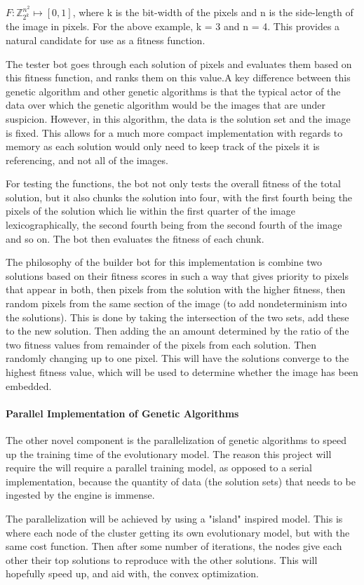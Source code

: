 \documentclass[12pt]{article}
\begin{document}
$ F : {\mathbb{Z}_{2^k}^{n^2}} \mapsto [0, 1] $, where k is the bit-width of the pixels and n is the side-length of the image in pixels. For the above example, k = 3 and n = 4. This provides a natural candidate for use as a fitness function.
\par The tester bot goes through each solution of pixels and evaluates them based on this fitness function, and ranks them on this value.A key difference between this genetic algorithm and other genetic algorithms is that the typical actor of the data over which the genetic algorithm would be the images that are under suspicion. However, in this algorithm, the data is the solution set and the image is fixed. This allows for a much more compact implementation with regards to memory as each solution would only need to keep track of the pixels it is referencing, and not all of the images. 
\par For testing the functions, the bot not only tests the overall fitness of the total solution, but it also chunks the solution into four, with the first fourth being the pixels of the solution which lie within the first quarter of the image lexicographically, the second fourth being from the second fourth of the image and so on. The bot then evaluates the fitness of each chunk.  
\par The philosophy of the builder bot for this implementation is combine two solutions based on their fitness scores in such a way that gives priority to pixels that appear in both, then pixels from the solution with the higher fitness, then random pixels from the same section of the image (to add nondeterminism into the solutions). This is done by taking the intersection of the two sets, add these to the new solution. Then adding the an amount determined by the ratio of the two fitness values from remainder of the pixels from each solution. Then randomly changing up to one pixel. This will have the solutions converge to the highest fitness value, which will be used to determine whether the image has been embedded. 

\paragraph{Parallel Implementation of Genetic Algorithms}
\par The other novel component is the parallelization of genetic
algorithms to speed up the training time of the evolutionary model. The reason this project will require the will require a parallel training model, as opposed to a serial implementation, because the quantity of data (the solution sets) that needs to be ingested by the engine is immense.
\par The parallelization will be achieved by using a "island" inspired model. This is where each node of the cluster getting its own evolutionary model, but with the same cost function. Then after some number of iterations, the nodes give each other their top solutions to reproduce with the other solutions. This will hopefully speed up, and aid with, the convex optimization.
\end{document}

